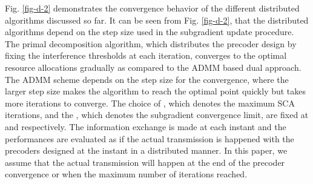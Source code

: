 Fig. \ref{fig-d-2} demonstrates the convergence behavior of the different distributed algorithms discussed so far. It can be seen from Fig. \ref{fig-d-2}, that the distributed algorithms depend on the step size used in the subgradient update procedure. The primal decomposition algorithm, which distributes the precoder design by fixing the interference thresholds at each iteration, converges to the optimal resource allocations gradually as compared to the \ac{ADMM} based dual approach. The \ac{ADMM} scheme depends on the step size for the convergence, where the larger step size makes the algorithm to reach the optimal point quickly but takes more iterations to converge. The choice of , which denotes the maximum \ac{SCA} iterations, and the , which denotes the subgradient convergence limit, are fixed at  and  respectively. The information exchange is made at each instant and the performances are evaluated as if the actual transmission is happened with the precoders  designed at the  instant in a distributed manner. In this paper, we assume that the actual transmission will happen at the end of the precoder convergence or when the maximum number of iterations reached.

